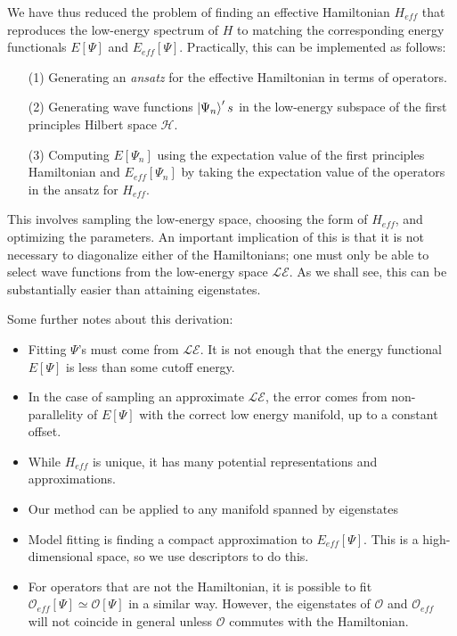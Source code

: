 We have thus reduced the problem of finding an effective Hamiltonian $H_{eff}$ that reproduces the low-energy spectrum of $H$ to matching the corresponding energy functionals $E[\Psi]$ and $E_{eff}[\Psi]$. 
Practically, this can be implemented as follows: 
\begin{itemize}
\item [(1)]Generating an \textit{ansatz} for the effective Hamiltonian in terms of operators. 
\item [(2)]Generating wave functions $\ket{\Psi_n}'s$ in the low-energy subspace of the first principles Hilbert space ${\mathcal H}$.
\item [(3)]Computing $E[\Psi_n]$ using the expectation value of the first principles Hamiltonian and $E_{eff}[\Psi_n]$ by taking the expectation value of the operators in the ansatz for $H_{eff}$. 
\end{itemize}
This involves sampling the low-energy space, choosing the form of $H_{eff}$, and optimizing the parameters.
An important implication of this is that it is not necessary to diagonalize either of the Hamiltonians; one must only be able to select wave functions from the low-energy space $\mathcal{LE}$.
As we shall see, this can be substantially easier than attaining eigenstates.

Some further notes about this derivation:
\begin{itemize}
\item Fitting $\Psi$'s must come from $\mathcal{LE}$. It is not enough that the energy functional $E[\Psi]$ is less than some cutoff energy.
\item In the case of sampling an approximate $\mathcal{LE}$, the error comes from non-parallelity of $E[\Psi]$ with the correct low energy manifold, up to a constant offset.
\item While $H_{eff}$ is unique, it has many potential representations and approximations. 
\item Our method can be applied to any manifold spanned by eigenstates
\item Model fitting is finding a compact approximation to $E_{eff}[\Psi]$. This is a high-dimensional space, so we use descriptors to do this.	
\item For operators that are not the Hamiltonian, it is possible to fit $\mathcal{O}_{eff}[\Psi] \simeq {\mathcal O}[\Psi]$ in a similar way. However, the eigenstates of ${\mathcal O}$ and ${\mathcal O}_{eff}$ will not coincide in general unless $\mathcal{O}$ commutes with the Hamiltonian.
\end{itemize}


